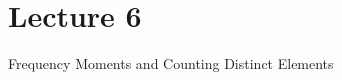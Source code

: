 \documentclass[../main.tex]{subfiles}
\begin{document}
\section{Lecture 6}{Frequency Moments and Counting Distinct Elements}
\end{document}
